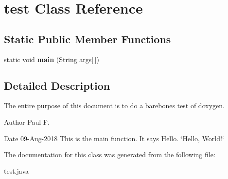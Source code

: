\hypertarget{classtest}{}\section{test Class Reference}
\label{classtest}
\subsection*{Static Public Member Functions}
\begin{DoxyCompactItemize}
\item 
\mbox{\label{classtest_a75c8cd7b6ecf591bec8627109adcbc9d}} 
static void {\bfseries main} (String args\mbox{[}$\,$\mbox{]})
\end{DoxyCompactItemize}


\subsection{Detailed Description}
The entire purpose of this document is to do a barebones test of doxygen.

\begin{DoxyAuthor}{Author}
Paul F. 
\end{DoxyAuthor}
\begin{DoxyDate}{Date}
09-\/\+Aug-\/2018 This is the main function. It says Hello.  \char`\"{}\+Hello, World!\char`\"{} 
\end{DoxyDate}


The documentation for this class was generated from the following file\+:\begin{DoxyCompactItemize}
\item 
test.\+java\end{DoxyCompactItemize}
